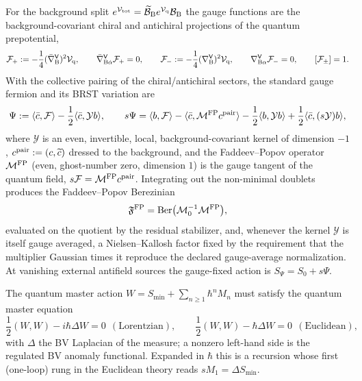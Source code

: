 For the background split $e^{\mathcal{V}_{\rm tot}}=\widetilde{\mathcal B}_{\rm B}e^{\mathcal{V}_{\rm q}}\mathcal B_{\rm B}$ the gauge functions are the background-covariant chiral and antichiral projections of the quantum prepotential,
\begin{equation}\label{eq:gaugebv:Fpm}
\mathcal F_+:=-\frac14(\bar\nabla^{\mathsf V}_{\rm B})^2\mathcal{V}_{\rm q},\qquad
\bar\nabla^{\mathsf V}_{{\rm B}\dot\alpha}\mathcal F_+=0,\qquad
\mathcal F_-:=-\frac14(\nabla^{\mathsf V}_{\rm B})^2\mathcal{V}_{\rm q},\qquad
\nabla^{\mathsf V}_{{\rm B}\alpha}\mathcal F_-=0,\qquad
[\mathcal F_\pm]=1.
\end{equation}
With the collective pairing of the chiral/antichiral sectors, the standard gauge fermion and its BRST variation are
\begin{equation}\label{eq:gaugebv:sPsi}
\Psi:=\langle\bar c,\mathcal F\rangle-\frac12\langle\bar c,\mathcal Yb\rangle,\qquad
s\Psi=\langle b,\mathcal F\rangle
-\langle\bar c,\mathcal M^{\rm FP}c^{\rm pair}\rangle
-\frac12\langle b,\mathcal Yb\rangle
+\frac12\langle\bar c,(s\mathcal Y)b\rangle,
\end{equation}
where $\mathcal Y$ is an even, invertible, local, background-covariant kernel of dimension $-1$, $c^{\rm pair}:=(c,\widetilde c)$ dressed to the background, and the Faddeev--Popov operator $\mathcal M^{\rm FP}$ (even, ghost-number zero, dimension $1$) is the gauge tangent of the quantum field, $s\mathcal F=\mathcal M^{\rm FP}c^{\rm pair}$. Integrating out the non-minimal doublets produces the Faddeev--Popov Berezinian
\begin{equation}\label{eq:gaugebv:FPfactor}
\mathfrak F^{\rm FP}=\operatorname{Ber}\bigl(\mathcal M_0^{-1}\mathcal M^{\rm FP}\bigr),
\end{equation}
evaluated on the quotient by the residual stabilizer, and, whenever the kernel $\mathcal Y$ is itself gauge averaged, a Nielsen--Kallosh factor fixed by the requirement that the multiplier Gaussian times it reproduce the declared gauge-average normalization. At vanishing external antifield sources the gauge-fixed action is $S_\Psi=S_0+s\Psi$.

The quantum master action $W=S_{\min}+\sum_{n\ge1}\hbar^nM_n$ must satisfy the quantum master equation
\begin{equation}\label{eq:gaugebv:QME}
\frac12(W,W)-i\hbar\Delta W=0\ \ (\text{Lorentzian}),\qquad
\frac12(W,W)-\hbar\Delta W=0\ \ (\text{Euclidean}),
\end{equation}
with $\Delta$ the BV Laplacian of the measure; a nonzero left-hand side is the regulated BV anomaly functional. Expanded in $\hbar$ this is a recursion whose first (one-loop) rung in the Euclidean theory reads $sM_1=\Delta S_{\min}$.

